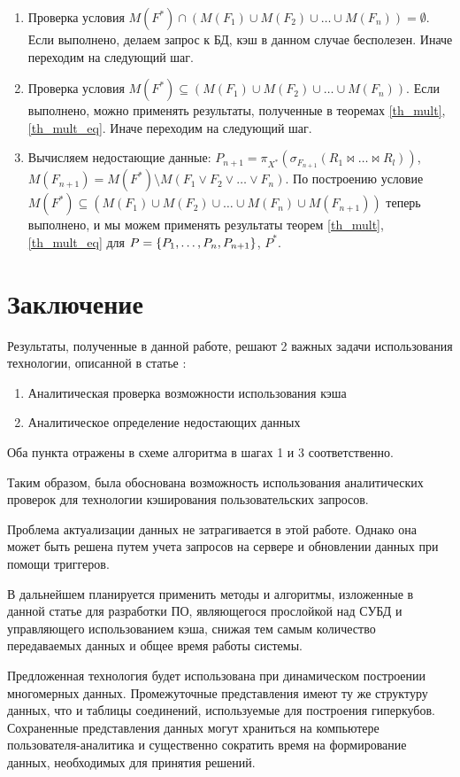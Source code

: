 \documentclass[10pt,a4paper]{article}
\begin{document}
\begin{enumerate}[label=\bfseries Шаг \arabic*:]
  \item Проверка условия $M(F^{\ast}) \cap (M(F_1) \cup M(F_2) \cup \dots \cup M(F_n)) = \emptyset$.
  Если выполнено, делаем запрос к БД, кэш в данном случае бесполезен. Иначе переходим на
  следующий шаг.
  \item Проверка условия $M(F^{\ast}) \subseteq (M(F_1) \cup M(F_2) \cup \dots \cup M(F_n))$. Если
  выполнено, можно применять результаты, полученные в теоремах \ref{th_mult}, \ref{th_mult_eq}. Иначе переходим на следующий шаг.
  \item Вычисляем недостающие данные: $P_{n + 1} = \pi_{X^{\ast}} (\sigma_{F_{n + 1}} (R_1 \Join
  \dots \Join R_l))$, $M(F_{n + 1}) = M(F^{\ast}) \setminus M(F_1 \vee F_2 \vee \dots \vee F_n)$. По построению условие $M(F^{\ast})
  \subseteq (M(F_1) \cup M(F_2) \cup \dots \cup M(F_n) \cup M(F_{n + 1}))$ теперь выполнено, и мы
  можем применять результаты теорем \ref{th_mult}, \ref{th_mult_eq} для $P = \{P_1, \dots, P_n,\\
  P_{n + 1}\}$, $P^{\ast}$.
\end{enumerate}

\section*{Заключение}
Результаты, полученные в данной работе, решают 2 важных задачи использования технологии, описанной в статье \cite{mosin_zykin}:
\begin{enumerate}
  \item Аналитическая проверка возможности использования кэша    
  \item Аналитическое определение недостающих данных
\end{enumerate}

Оба пункта отражены в схеме алгоритма в шагах 1 и 3 соответственно.

Таким образом, была обоснована возможность использования аналитических проверок для технологии кэширования пользовательских запросов.

Проблема актуализации данных не затрагивается в этой работе. Однако она может быть решена
путем учета запросов на сервере и обновлении данных при помощи триггеров.

В дальнейшем планируется применить методы и алгоритмы, изложенные в данной статье для разработки ПО, являющегося прослойкой над СУБД и управляющего использованием кэша, снижая тем самым количество передаваемых данных и общее время работы системы.

Предложенная технология будет использована при динамическом построении многомерных данных.
Промежуточные представления имеют ту же структуру данных, что и таблицы соединений, используемые для
построения гиперкубов. Сохраненные представления данных могут храниться на компьютере пользователя-аналитика и существенно сократить время на формирование данных, необходимых для принятия решений.

\printbibliography
\end{document}

